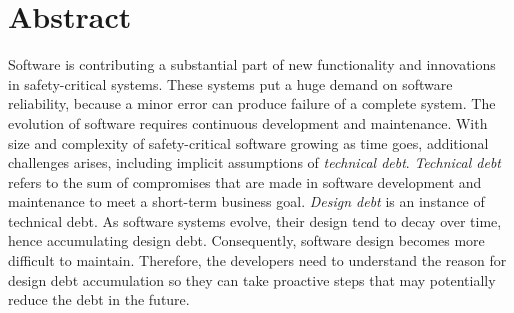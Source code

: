 


\clearpage
{} 				
\setcounter{page}{1}

\pagestyle{fancy}
\fancyhf{}
\renewcommand{\chaptermark}[1]{\markboth{\chaptername\ \thechapter.\ #1}{}}
\renewcommand{\sectionmark}[1]{\markright{\thesection\ #1}}
\renewcommand{\headrulewidth}{0.1ex}
\renewcommand{\footrulewidth}{0.1ex}
\fancyfoot[LE,RO]{\thepage}
\fancypagestyle{plain}{\fancyhf{}\fancyfoot[LE,RO]{\thepage}\renewcommand{\headrulewidth}{0ex}}

\section*{\Huge Abstract}
Software is contributing a substantial part of new functionality and innovations in safety-critical systems. These systems put a huge demand on software reliability, because a minor error can produce failure of a complete system. The evolution of software requires continuous development and maintenance. With size and complexity of safety-critical software growing as time goes, additional challenges arises, including implicit assumptions of \textit{technical debt}. \textit{Technical debt} refers to the sum of compromises that are made in software development and maintenance to meet a short-term business goal. \textit{Design debt} is an instance of technical debt. As software systems evolve, their design tend to decay over time, hence accumulating design debt. Consequently, software design becomes more difficult to maintain. Therefore, the developers need to understand the reason for design debt accumulation so they can take proactive steps that may potentially reduce the debt in the future.

